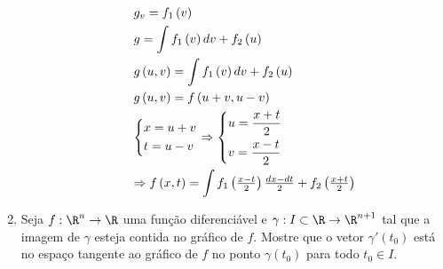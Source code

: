 \documentclass[11pt, oneside, a4paper]{gsm-l}
\begin{document}
\begin{enumerate}
\begin{sol}
\begin{enumerate}[(a)]
\[
\begin{gathered}
  g_v  = f_1 \left( v \right) \hfill \\
  g = \int {f_1 \left( v \right)dv}  + f_2 \left( u \right) \hfill \\
  g\left( {u,v} \right) = \int {f_1 \left( v \right)dv}  + f_2 \left( u \right) \hfill \\
  g\left( {u,v} \right) = f\left( {u + v,u - v} \right) \hfill \\
  \left\{ \begin{gathered}
  x = u + v \hfill \\
  t = u - v \hfill \\
\end{gathered}  \right. \Rightarrow \left\{ \begin{gathered}
  u = \frac{{x + t}}
{2} \hfill \\
  v = \frac{{x - t}}
{2} \hfill \\
\end{gathered}  \right. \hfill \\
   \Rightarrow f\left( {x,t} \right) = \int {f_1 \left( {\tfrac{{x - t}}
{2}} \right)\tfrac{{dx - dt}}
{2}}  + f_2 \left( {\tfrac{{x + t}}
{2}} \right) \hfill \\
\end{gathered}
\]

  \end{enumerate}
\end{sol}

  \item Seja $f:\R^n \to \R$ uma função diferenciável e $\gamma :I \subset \R \to \R^{n + 1}$ tal que a imagem de $\gamma$ esteja contida no gráfico de $f$. Mostre que o vetor $\gamma '\left( {t_0 } \right)$ está no espaço tangente ao gráfico de $f$ no ponto $\gamma \left( {t_0 } \right)$ para todo $t_0 \in I$.


\end{enumerate}
\end{document}

